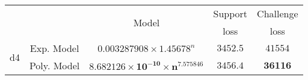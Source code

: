 \begin{tabular}{ccccc} 
\hline 
 &  & \multirow{2}{*}{Model} & Support & Challenge\tabularnewline 
 &  &  & loss  & loss\tabularnewline 
\hline 
\hline 
\multirow{2}{*}{d4} & Exp. Model & $0.003287908\times 1.45678^{n}$ & $3452.5$ & $41554$ \tabularnewline 
 & Poly. Model & $\mathbf{8.682126\times10^{-10}\times n^{7.575846}}$ & $\mathbf{3456.4}$ & $\mathbf{36116}$ \tabularnewline 
\hline 
\end{tabular} 

